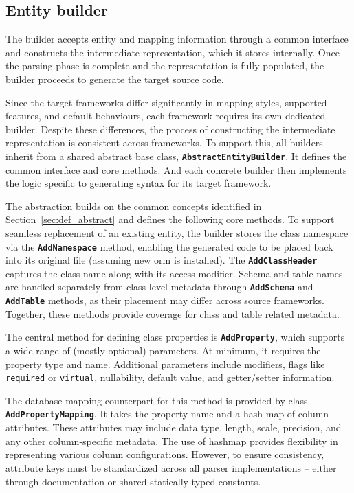 \subsection{Entity builder}

The builder accepts entity and mapping information through a common interface and constructs the intermediate representation, which it stores internally. Once the parsing phase is complete and the representation is fully populated, the builder proceeds to generate the target source code.

Since the target frameworks differ significantly in mapping styles, supported features, and default behaviours, each framework requires its own dedicated builder. Despite these differences, the process of constructing the intermediate representation is consistent across frameworks. To support this, all builders inherit from a shared abstract base class, \texttt{\textbf{AbstractEntityBuilder}}. It defines the common interface and core methods. And each concrete builder then implements the logic specific to generating syntax for its target framework.

The abstraction builds on the common concepts identified in Section~\ref{sec:def_abstract} and defines the following core methods. To support seamless replacement of an existing entity, the builder stores the class namespace via the \texttt{\textbf{AddNamespace}} method, enabling the generated code to be placed back into its original file (assuming new \acrshort{orm} is installed). The \texttt{\textbf{AddClassHeader}} captures the class name along with its access modifier. 
Schema and table names are handled separately from class-level metadata through \texttt{\textbf{AddSchema}} and \texttt{\textbf{AddTable}} methods, as their placement may differ across source frameworks. Together, these methods provide coverage for class and table related metadata. 

The central method for defining class properties is \texttt{\textbf{AddProperty}}, which supports a wide range of (mostly optional) parameters. At minimum, it requires the property type and name. Additional parameters include modifiers, flags like \texttt{required} or \texttt{virtual}, nullability, default value, and getter/setter information. 

The database mapping counterpart for this method is provided by class \texttt{\textbf{AddPropertyMapping}}. It takes the property name and a hash map of column attributes. These attributes may include data type, length, scale, precision, and any other column-specific metadata. The use of hashmap provides flexibility in representing various column configurations. However, to ensure consistency, attribute keys must be standardized across all parser implementations -- either through documentation or shared statically typed constants.

